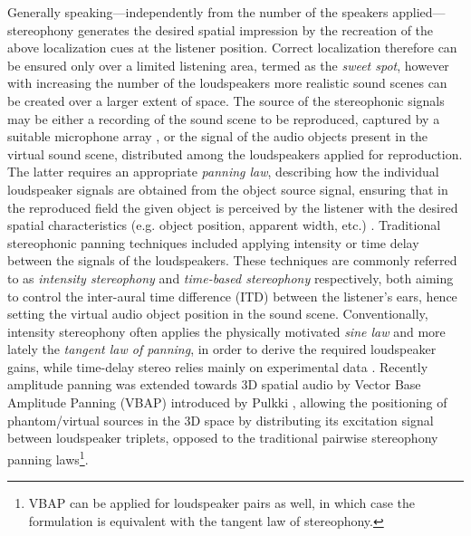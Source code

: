 Generally speaking---independently from the number of the speakers applied---stereophony generates the desired spatial impression by the recreation of the above localization cues at the listener position.
Correct localization therefore can be ensured only over a limited listening area, termed as the \emph{sweet spot}, however with increasing the number of the loudspeakers more realistic sound scenes can be created over a larger extent of space.
The source of the stereophonic signals may be either a recording of the sound scene to be reproduced, captured by a suitable microphone array \cite{lipshitz1985stereo, williams1999microphone, wittek2017development}, or the signal of the audio objects present in the virtual sound scene, distributed among the loudspeakers applied for reproduction.
The latter requires an appropriate \emph{panning law}, describing how the individual loudspeaker signals are obtained from the object source signal, ensuring that in the reproduced field the given object is perceived by the listener with the desired spatial characteristics (e.g. object position, apparent width, etc.) \cite{Pulkki2001a, Pulkki2001b}.
Traditional stereophonic panning techniques included applying intensity or time delay between the signals of the loudspeakers.
These techniques are commonly referred to as \emph{intensity stereophony} and \emph{time-based stereophony} respectively, both aiming to control the inter-aural time difference (ITD) between the listener's ears, hence setting the virtual audio object position in the sound scene.
Conventionally, intensity stereophony often applies the physically motivated \emph{sine law} \cite{Bauer1961, Rabenstein2007} and more lately the \emph{tangent law of panning}, \cite{Bennett1985, Rabenstein2007} in order to derive the required loudspeaker gains, while time-delay stereo relies mainly on experimental data \cite{lipshitz1985stereo, Hugonnet1997, Rumsey2001}.
Recently amplitude panning was extended towards 3D spatial audio by Vector Base Amplitude Panning (VBAP) introduced by Pulkki \cite{Pulkki1997}, allowing the positioning of phantom/virtual sources in the 3D space by distributing its excitation signal between loudspeaker triplets, opposed to the traditional pairwise stereophony panning laws\footnote{VBAP can be applied for loudspeaker pairs as well, in which case the formulation is equivalent with the tangent law of stereophony.}.

